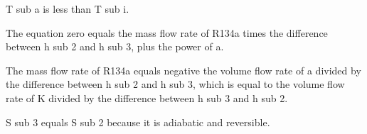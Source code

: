 T sub a is less than T sub i.

The equation zero equals the mass flow rate of R134a times the difference between h sub 2 and h sub 3, plus the power of a.

The mass flow rate of R134a equals negative the volume flow rate of a divided by the difference between h sub 2 and h sub 3, which is equal to the volume flow rate of K divided by the difference between h sub 3 and h sub 2.

S sub 3 equals S sub 2 because it is adiabatic and reversible.